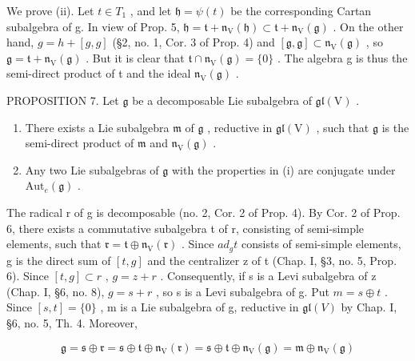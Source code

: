 We prove (ii). Let \(t \in T_{1}\) , and let \(\mathfrak{h} = \psi(t)\) be the corresponding Cartan subalgebra of g. In view of Prop. 5, \(\mathfrak{h} = \mathfrak{t} + \mathfrak{n}_{\mathrm{V}}(\mathfrak{h}) \subset \mathfrak{t} + \mathfrak{n}_{\mathrm{V}}(\mathfrak{g})\) . On the other hand, \(g = h + [g, g]\) (§2, no. 1, Cor. 3 of Prop. 4) and \([\mathfrak{g}, \mathfrak{g}] \subset \mathfrak{n}_{\mathrm{V}}(\mathfrak{g})\) , so \(\mathfrak{g} = \mathfrak{t} + \mathfrak{n}_{\mathrm{V}}(\mathfrak{g})\) . But it is clear that \(\mathfrak{t} \cap \mathfrak{n}_{\mathrm{V}}(\mathfrak{g}) = \{0\}\) . The algebra g is thus the semi-direct product of t and the ideal \(\mathfrak{n}_{\mathrm{V}}(\mathfrak{g})\) .

PROPOSITION 7. Let \(\mathfrak{g}\) be a decomposable Lie subalgebra of \(\mathfrak{gl}(\mathrm{V})\) .

\begin{enumerate}
\def\labelenumi{(\roman{enumi})}
\item
  There exists a Lie subalgebra \(\mathfrak{m}\) of \(\mathfrak{g}\) , reductive in \(\mathfrak{gl}(\mathrm{V})\) , such that \(\mathfrak{g}\) is the semi-direct product of \(\mathfrak{m}\) and \(\mathfrak{n}_{\mathrm{V}}(\mathfrak{g})\) .
\item
  Any two Lie subalgebras of \(\mathfrak{g}\) with the properties in (i) are conjugate under \(\mathrm{Aut}_e(\mathfrak{g})\) .
\end{enumerate}

The radical r of g is decomposable (no. 2, Cor. 2 of Prop. 4). By Cor. 2 of Prop. 6, there exists a commutative subalgebra t of r, consisting of semi-simple elements, such that \(\mathfrak{r} = \mathfrak{t} \oplus \mathfrak{n}_{\mathrm{V}}(\mathfrak{r})\) . Since \(ad_{g}t\) consists of semi-simple elements, g is the direct sum of \([t, g]\) and the centralizer z of t (Chap. I, §3, no. 5, Prop. 6). Since \([t, g] \subset r\) , \(g = z + r\) . Consequently, if s is a Levi subalgebra of z (Chap. I, §6, no. 8), \(g = s + r\) , so s is a Levi subalgebra of g. Put \(m = s \oplus t\) . Since \([s, t] = \{0\}\) , m is a Lie subalgebra of g, reductive in \(\mathfrak{gl}(V)\) by Chap. I, §6, no. 5, Th. 4. Moreover,

\[
\mathfrak {g} = \mathfrak {s} \oplus \mathfrak {r} = \mathfrak {s} \oplus \mathfrak {t} \oplus \mathfrak {n} _ {\mathrm{V}} (\mathfrak {r}) = \mathfrak {s} \oplus \mathfrak {t} \oplus \mathfrak {n} _ {\mathrm{V}} (\mathfrak {g}) = \mathfrak {m} \oplus \mathfrak {n} _ {\mathrm{V}} (\mathfrak {g})
\]

